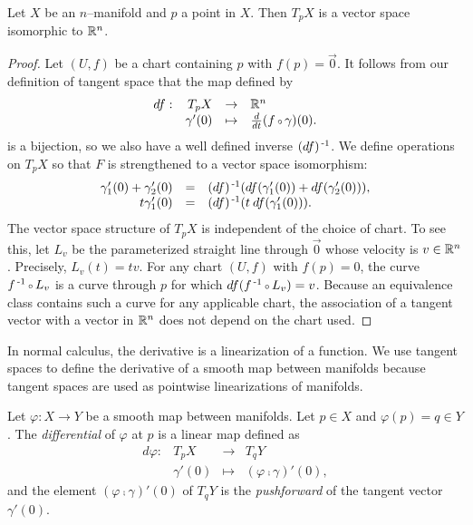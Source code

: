 \begin{prop}
	\label{prop:tangentspacevectorspace}
	Let $X$ be an $n$--manifold and $p$ a point in $X$.
	Then $T_p X$ is a vector space isomorphic to $\mathbb{R}^n$.
\end{prop}

\begin{proof}
	Let $(U,f)$ be a chart containing $p$ with $f(p)=\vec{0}$.
	It follows from our definition of tangent space that the map defined by
	\[
		\begin{array}{crcl}
			df : & T_p X & \to & \RRN \\
			& \gamma'(0) & \mapsto & \Ddt(f\comp \gamma)(0) .
		\end{array}
	\]
	is a bijection, so we also have a well defined inverse $(df)^{\,\text{-}1}$.
	We define operations on $T_p X$ so that $F$ is strengthened to a vector space isomorphism:
	\[
		\begin{array}{rcl}
			\gamma_1'(0)+\gamma_2'(0) & = & (df)^{\,\text{-}1}(df(\gamma_1'(0))+df(\gamma_2'(0))), \\
			t\gamma_1'(0) & = & (df)^{\,\text{-}1}(t\:df(\gamma_1'(0))).
		\end{array}
	\]
	The vector space structure of $T_p X$ is independent of the choice of chart.
	To see this, let $L_v$ be the parameterized straight line through $\vec{0}$ whose velocity is $v\in\mathbb{R}^n$.
	Precisely, $L_v(t)=tv.$
	For any chart $(U,f)$ with $f(p)=0$, the curve $f\inv\comp L_v$ is a curve through $p$ for which $df(f\inv\comp L_v)=v$.
	Because an equivalence class contains such a curve for any applicable chart, the association of a tangent vector with a vector in $\mathbb{R}^n$ does not depend on the chart used.
\end{proof}

In normal calculus, the derivative is a linearization of a function.
We use tangent spaces to define the derivative of a smooth map between manifolds because tangent spaces are used as pointwise linearizations of manifolds.

\begin{defn}[Differential]
	Let $\varphi:X\to Y$ be a smooth map between manifolds.
	Let $p\in X$ and $\varphi(p)=q\in Y$.
	The \emph{differential} of $\varphi$ at $p$ is a linear map defined as
	\[
		\begin{array}{crcl}
			d\varphi: & T_p X & \to & T_q Y\\
					  & \gamma'(0) & \mapsto & (\varphi\comp\gamma)'(0),
		\end{array}
	\]
	and the element $(\varphi\comp\gamma)'(0)$ of $T_q Y$ is the \emph{pushforward} of the tangent vector $\gamma'(0)$.
\end{defn}

